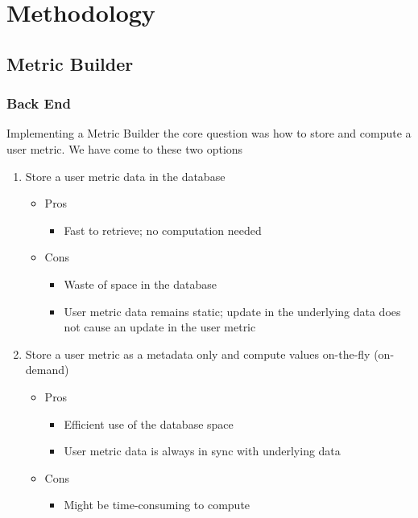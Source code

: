 \chapter{Methodology}

	\section{Metric Builder}

		\subsection{Back End}

			Implementing a Metric Builder the core question was how to store and compute a user metric.
			We have come to these two options

			\begin{enumerate}[itemsep=-1.5mm]
				\item
					Store a user metric data in the database
					\begin{itemize}[itemsep=-1.5mm]
						\item
							Pros
							\begin{itemize}
								\item
									Fast to retrieve;
									no computation needed
							\end{itemize}
						\item
							Cons
							\begin{itemize}
								\item
									Waste of space in the database
								\item
									User metric data remains static;
									update in the underlying data does not cause an update in the user metric
							\end{itemize}
					\end{itemize}
				\item
					Store a user metric as a metadata only and compute values on-the-fly (on-demand)
					\begin{itemize}[itemsep=-1.5mm]
						\item
							Pros
							\begin{itemize}
								\item
									Efficient use of the database space
								\item
									User metric data is always in sync with underlying data
							\end{itemize}
						\item
							Cons
							\begin{itemize}
								\item
									Might be time-consuming to compute
							\end{itemize}
					\end{itemize}
			\end{enumerate}

